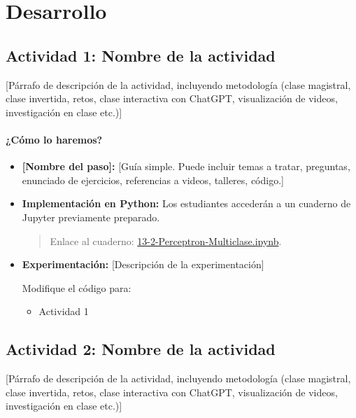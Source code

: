 \documentclass[a4,11pt]{aleph-notas}
\begin{document}
\section*{Desarrollo}

\subsection*{Actividad 1: Nombre de la actividad}

[Párrafo de descripción de la actividad, incluyendo metodología (clase magistral, clase invertida, retos, clase interactiva con ChatGPT, visualización de videos, investigación en clase etc.)]

\paragraph{¿Cómo lo haremos?}  
\begin{itemize}[leftmargin=*]
    \item \textbf{[Nombre del paso]:}  %
    [Guía simple. Puede incluir temas a tratar, preguntas, enunciado de ejercicios, referencias a videos, talleres, código.]
    \item \textbf{Implementación en Python:} Los estudiantes accederán a un cuaderno de Jupyter previamente preparado.
    \begin{quote}
        Enlace al cuaderno: \href{https://github.com/andres-merino/AprendizajeAutomaticoInicial-05-N0105/blob/main/2-Notebooks/13-2-Perceptron-Multiclase.ipynb}{13-2-Perceptron-Multiclase.ipynb}.
    \end{quote}
    \item \textbf{Experimentación:} 
    [Descripción de la experimentación]
    \begin{ejer}
    Modifique el código para:
    \begin{itemize}[leftmargin=*]
        \item Actividad 1
    \end{itemize}
    \end{ejer}
\end{itemize}

\subsection*{Actividad 2: Nombre de la actividad}

[Párrafo de descripción de la actividad, incluyendo metodología (clase magistral, clase invertida, retos, clase interactiva con ChatGPT, visualización de videos, investigación en clase etc.)]
\end{document}
